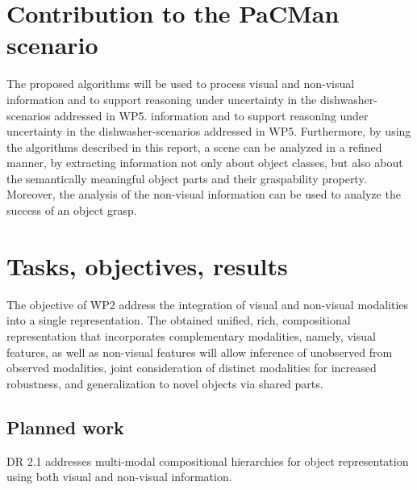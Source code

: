 \documentclass[a4paper,11pt,pdf]{pacmanreport}
\begin{document}
\section*{Contribution to the PaCMan scenario}

The proposed algorithms will be used to process visual and non-visual information and to support reasoning under uncertainty in the dishwasher-scenarios addressed in WP5.
information and to support reasoning under uncertainty in the 
dishwasher-scenarios addressed in WP5. Furthermore, by using the algorithms 
described in this report, a scene can be analyzed in a refined manner, by 
extracting information not only about object classes, but also about the 
semantically meaningful object parts and their graspability property. Moreover, 
the analysis of the non-visual information can be 
used to analyze the success of an object grasp.

\newpage

\section{Tasks, objectives, results}

The objective of WP2 address the integration of visual and non-visual modalities 
into a single representation. The obtained unified, rich, compositional 
representation that incorporates complementary modalities, namely, visual 
features, as well as non-visual features will allow inference of unobserved from 
observed modalities, joint consideration of distinct modalities for increased 
robustness, and generalization to novel objects via shared parts.

\subsection{Planned work}

DR 2.1 addresses multi-modal compositional hierarchies for object representation using both visual and non-visual information. 
\end{document}
